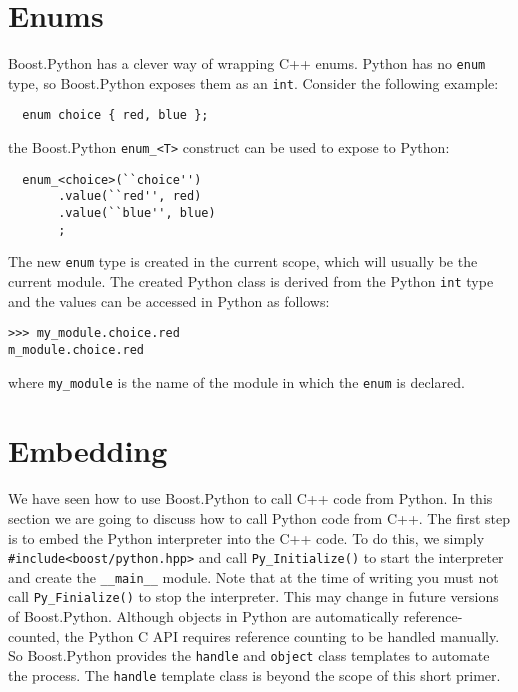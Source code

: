 \section{Enums}
Boost.Python has a clever way of wrapping C++ enums. Python has no \verb|enum| type, so Boost.Python exposes them as an \verb|int|. Consider the following example:
\begin{verbatim}
  enum choice { red, blue };
\end{verbatim}
the Boost.Python \verb|enum_<T>| construct can be used to expose to Python:
\begin{verbatim}
  enum_<choice>(``choice'')
       .value(``red'', red)
       .value(``blue'', blue)
       ;
\end{verbatim}
The new \verb|enum| type is created in the current scope, which will usually be the current module. The created Python class is derived from the Python \verb|int| type and the values can be accessed in Python as follows:
\begin{verbatim}
>>> my_module.choice.red
m_module.choice.red
\end{verbatim} 
where \verb|my_module| is the name of the module in which the \verb|enum| is declared.

\section{Embedding}
We have seen how to use Boost.Python to call C++ code from Python. In this section we are going to discuss how to call Python code from C++. The first step is to embed the Python interpreter into the C++ code. To do this, we simply \verb|#include<boost/python.hpp>| and call \verb|Py_Initialize()| to start the interpreter and create the \verb|__main__| module. Note that at the time of writing you must not call \verb|Py_Finialize()| to stop the interpreter. This may change in future versions of Boost.Python. Although objects in Python are automatically reference-counted, the Python C API requires reference counting to be handled manually. So Boost.Python provides the \verb|handle| and \verb|object| class templates to automate the process. The \verb|handle| template class is beyond the scope of this short primer. 

